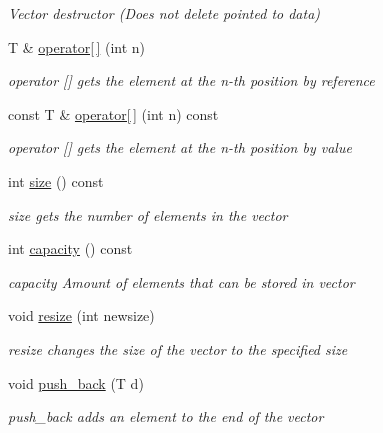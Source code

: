 \begin{DoxyCompactItemize}
\begin{DoxyCompactList}\small\item\em Vector destructor (Does not delete pointed to data) \end{DoxyCompactList}\item 
T \& \hyperlink{classmyStd_1_1vector_a7840f76cb8fdb56e3a70506c7e0fbf5a}{operator\mbox{[}$\,$\mbox{]}} (int n)
\begin{DoxyCompactList}\small\item\em operator \mbox{[}\mbox{]} gets the element at the n-\/th position by reference \end{DoxyCompactList}\item 
const T \& \hyperlink{classmyStd_1_1vector_ac86fa3944b7d23fc127f5b739935b5d6}{operator\mbox{[}$\,$\mbox{]}} (int n) const 
\begin{DoxyCompactList}\small\item\em operator \mbox{[}\mbox{]} gets the element at the n-\/th position by value \end{DoxyCompactList}\item 
int \hyperlink{classmyStd_1_1vector_a33ebe4dab379f466c8d3a2f08d9aa554}{size} () const 
\begin{DoxyCompactList}\small\item\em size gets the number of elements in the vector \end{DoxyCompactList}\item 
int \hyperlink{classmyStd_1_1vector_ad388bb612c6b9945731d562aeae8695b}{capacity} () const 
\begin{DoxyCompactList}\small\item\em capacity Amount of elements that can be stored in vector \end{DoxyCompactList}\item 
void \hyperlink{classmyStd_1_1vector_aa54bd9c3d8d3b6191d7eb7f85490eadb}{resize} (int newsize)
\begin{DoxyCompactList}\small\item\em resize changes the size of the vector to the specified size \end{DoxyCompactList}\item 
void \hyperlink{classmyStd_1_1vector_a16a7791abc12b34fee94f4ef48a5e157}{push\+\_\+back} (T d)
\begin{DoxyCompactList}\small\item\em push\+\_\+back adds an element to the end of the vector \end{DoxyCompactList}\item 

\end{DoxyCompactItemize}
